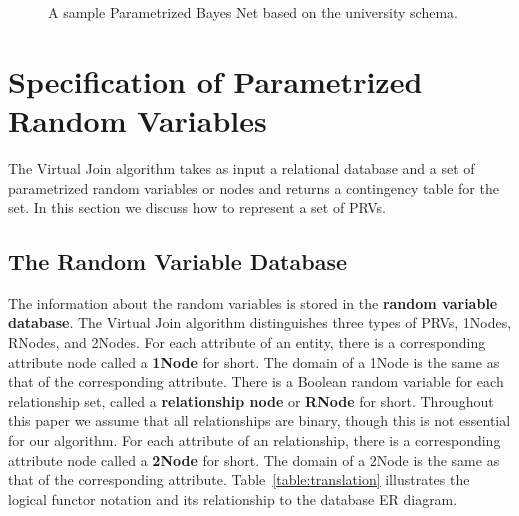 \documentclass{vldb}
\begin{document}
\begin{figure}[htbp] %
 \centering
{} 
\caption{ A sample Parametrized Bayes Net based on the university schema. 
}
 \label{fig:bn-example}
\end{figure}


\section{Specification of Parametrized Random Variables}

The Virtual Join algorithm takes as input a relational database and a set of parametrized random variables or nodes and returns a contingency table for the set. In this section we discuss how to represent a set of PRVs.


\subsection{The Random Variable Database}
The information about the random variables is stored in the \textbf{random variable database}.  
%
The Virtual Join algorithm distinguishes three types of PRVs, 1Nodes, RNodes, and 2Nodes. 
For each attribute of an entity, there is a corresponding attribute node called a \textbf{1Node} for short. The domain of a 1Node is the same as that of the corresponding attribute.  There is a Boolean random variable for each relationship set, called a \textbf{relationship node} or \textbf{RNode} for short.
Throughout this paper we assume that all relationships are binary, though this is not essential for our algorithm. 
For each attribute of an relationship, there is a corresponding attribute node called a \textbf{2Node} for short. The domain of a 2Node is the same as that of the corresponding attribute. 
Table~\ref{table:translation} illustrates %
the logical functor notation and its relationship to the database ER diagram. 
\end{document}

